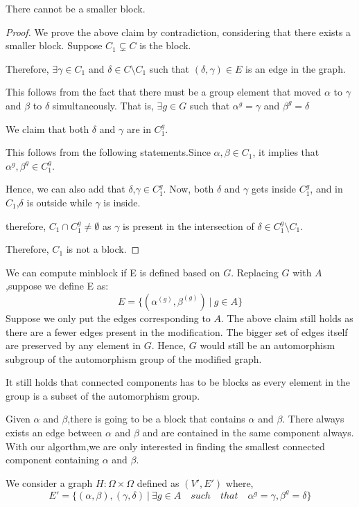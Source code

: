\begin{claim}
There cannot be a smaller block.
\end{claim}
\begin{proof}
We prove the above claim by contradiction, considering that there exists a smaller block.
Suppose $C_1 \subsetneq C$ is the block.

Therefore, $\exists \gamma \in C_1$ and $\delta \in C \setminus C_1$ such that $(\delta , \gamma) \in E$ is an edge in the graph.

This follows from the fact that there must be a group element that moved $\alpha$ to $\gamma$ and $\beta$ to $\delta$ simultaneously. That is,  $\exists g \in G$ such that $\alpha^g = \gamma$ and $\beta^g = \delta$

We claim that both $\delta$ and $\gamma$ are in $C_1^g$.


This follows from the following statements.Since $\alpha,\beta \in C_1$, it implies that $\alpha^g,\beta^g \in C_1^g$.

Hence, we can also add that $\delta$,$\gamma \in C_1^g$.
Now, both $\delta$ and $\gamma$ gets inside $C_1^g$, and in $ C_1$,$\delta$ is outside while $\gamma$ is inside.

therefore, $C_1 \cap C_1^g \neq \emptyset$ as $\gamma$ is present in the intersection of $\delta \in C_1^g \setminus C_1$.

Therefore, $C_1$ is not a block. 

\end{proof}
We can compute minblock if E is defined based on $G$. 
Replacing $G$ with $A$,suppose we define E as:
\[ E = \{(\alpha^{(g)},\beta^{(g)}) ~|~ g \in A\} \]
Suppose we only put the edges corresponding to $A$. The above claim still holds as there are a fewer edges present in the modification. The bigger set of edges itself are preserved by any element in $G$. Hence, $G$ would still be an automorphism subgroup of the automorphism group of the modified graph. 

It still holds that connected components has to be blocks as every element in the group is a subset of the automorphism group.

Given $\alpha$ and $\beta$,there is going to be a block that contains $\alpha$ and $\beta$. There always exists an edge between $\alpha$ and $\beta$ and are contained in the same component always. With our algorthm,we are only interested in finding the smallest connected component containing $\alpha$ and $\beta$.


We consider a graph $H : \Omega \times \Omega$ defined as $(V',E')$ where,
\[ E' = \{(\alpha,\beta),(\gamma,\delta) ~|~ \exists g \in A \quad such \quad that  \quad \alpha^g = \gamma , \beta^g = \delta\} \]

